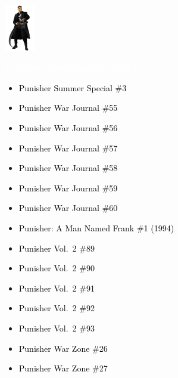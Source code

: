 \documentclass[12pt]{article}
\newcommand{\checkbox}{\raisebox{0.0ex}{\fbox{\rule{0ex}{1.5ex} \rule{1.5ex}{0ex}}}}
\begin{document}
\begin{center}
    \vspace*{2cm}
    \includegraphics[width=0.1\textwidth]{PUNISHER1.PNG}
    \vspace{0.3cm}

    {\Huge \textbf{\textcolor{white}{Punisher Chronological Checklist}}}
\end{center}

\vspace{0.3cm}
\noindent
\begin{tcolorbox}[
  colback=white!95!gray,
  colframe=black,
  width=\textwidth,
  arc=4mm,
  auto outer arc,
  boxrule=0.8pt,
  left=8pt,right=8pt,top=8pt,bottom=8pt
]
\begin{itemize}[left=0pt,label={\checkbox}]
    \item \textcolor{black}{Punisher Summer Special \#3}
    \item \textcolor{black}{Punisher War Journal \#55}
    \item \textcolor{black}{Punisher War Journal \#56}
    \item \textcolor{black}{Punisher War Journal \#57}
    \item \textcolor{black}{Punisher War Journal \#58}
    \item \textcolor{black}{Punisher War Journal \#59}
    \item \textcolor{black}{Punisher War Journal \#60}
    \item \textcolor{black}{Punisher: A Man Named Frank \#1 (1994)}
    \item \textcolor{black}{Punisher Vol.\ 2 \#89}
    \item \textcolor{black}{Punisher Vol.\ 2 \#90}
    \item \textcolor{black}{Punisher Vol.\ 2 \#91}
    \item \textcolor{black}{Punisher Vol.\ 2 \#92}
    \item \textcolor{black}{Punisher Vol.\ 2 \#93}
    \item \textcolor{black}{Punisher War Zone \#26}
    \item \textcolor{black}{Punisher War Zone \#27}
\end{itemize}
\end{tcolorbox}
\end{document}
